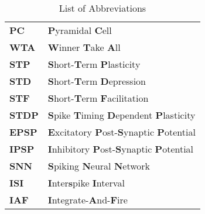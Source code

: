 \begin{table}[htbp]
    \centering
    \begin{tabular}{|l|l|}
        \hline
        \textbf{PC} & \textbf{P}yramidal \textbf{C}ell\\
        \textbf{WTA} & \textbf{W}inner \textbf{T}ake \textbf{A}ll\\
        \textbf{STP} & \textbf{S}hort-\textbf{T}erm \textbf{P}lasticity\\
        \textbf{STD} & \textbf{S}hort-\textbf{T}erm \textbf{D}epression\\
        \textbf{STF} & \textbf{S}hort-\textbf{T}erm \textbf{F}acilitation\\
        \textbf{STDP} & \textbf{S}pike \textbf{T}iming \textbf{D}ependent \textbf{P}lasticity\\
        \textbf{EPSP} & \textbf{E}xcitatory \textbf{P}ost-\textbf{S}ynaptic \textbf{P}otential\\
        \textbf{IPSP} & \textbf{I}nhibitory \textbf{P}ost-\textbf{S}ynaptic \textbf{P}otential\\
        \textbf{SNN} & \textbf{S}piking \textbf{N}eural \textbf{N}etwork\\
        \textbf{ISI} & \textbf{I}nter\textbf{s}pike \textbf{I}nterval \\
        \textbf{IAF} & \textbf{I}ntegrate-\textbf{A}nd-\textbf{F}ire \\
        \hline
    \end{tabular}
    \caption{List of Abbreviations}
    \label{tab:list_of_abbreviations}
\end{table}






